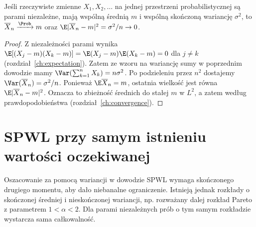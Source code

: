 \begin{wniosek}
Jeśli rzeczywiste zmienne $X_1,X_2,\ldots$ na jednej
przestrzeni probabilistycznej są parami niezależne,
mają wspólną średnią $m$ i wspólną skończoną wariancję $\sigma^2$,
to $\overline X_n\xrightarrow{\Prob}m$ oraz
$\E|\overline X_n-m|^2=\sigma^2/n\to0$.
\end{wniosek}
\begin{proof}
Z niezależności parami wynika
$\E[(X_j-m)(X_k-m)]=\E(X_j-m)\E(X_k-m)=0$ dla $j\ne k$
(rozdział~\ref{ch:expectation}). Zatem ze wzoru
na wariancję sumy w poprzednim dowodzie mamy
$\Var(\sum_{k=1}^nX_k)=n\sigma^2$.
Po podzieleniu przez $n^2$ dostajemy
$\Var(\overline X_n)=\sigma^2/n$.
Ponieważ $\E\overline X_n=m$, ostatnia wielkość
jest równa $\E|\overline X_n-m|^2$.
Oznacza to zbieżność średnich do stałej $m$ w $L^2$,
a zatem według prawdopodobieństwa
(rozdział~\ref{ch:convergence}).
\end{proof}

\section{SPWL przy samym istnieniu wartości oczekiwanej}

Oszacowanie za pomocą wariancji w dowodzie SPWL
wymaga skończonego drugiego momentu, aby dało
niebanalne ograniczenie. Istnieją jednak rozkłady
o skończonej średniej i nieskończonej wariancji,
np. rozważany dalej rozkład Pareto z parametrem
$1<\alpha<2$. Dla parami niezależnych prób o tym
samym rozkładzie wystarcza sama całkowalność.

